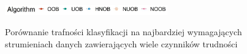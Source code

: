 \begin{figure}[h]
    \centering
    \includegraphics[width=7cm]{figures/algorithms_legend_hnob.JPG}
\end{figure}

\vspace{-1.2cm}

\begin{figure}[h]
    \centering
    \qquad
    \caption{Porównanie trafności klasyfikacji na najbardziej wymagających strumieniach danych zawierających wiele czynników trudności}\label{Figure:ComplexComparisonHNOB}
\end{figure}

